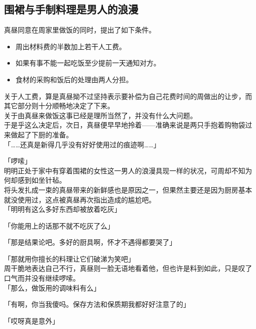 \subsection{围裙与手制料理是男人的浪漫}

真昼同意在周家里做饭的同时，提出了如下条件。\\

\begin{itemize}
    \item 周出材料费的半数加上若干人工费。
    \item 如果有事不能一起吃饭至少提前一天通知对方。
    \item 食材的采购和饭后的处理由两人分担。
\end{itemize}

关于人工费，算是真昼拗不过坚持表示要补偿为自己花费时间的周做出的让步，而其它部分则十分顺畅地决定了下来。\\

关于由真昼来做饭这事已经是理所当然了，并没有什么大问题。\\

于是乎这么决定后，次日，真昼便早早地拎着——准确来说是两只手抱着购物袋过来做起了下厨的准备。\\

「……还真是新得几乎没有好好使用过的痕迹啊……」

「啰嗦」\\

明明正处于家中有穿着围裙的女性这一男人的浪漫具现一样的状况，可周却不知为何却感到如坐针毡。\\

将头发扎成一束的真昼带来的新鲜感也是原因之一，但果然主要还是因为厨房基本就没使用过，这点被真昼再次指出造成的尴尬吧。\\

「明明有这么多好东西却被放着吃灰」

「你能用上的话那不就不吃灰了么」

「那是结果论吧。多好的厨具啊，怀才不遇得都要哭了」

「那就用你擅长的料理让它们破涕为笑吧」\\

周干脆地表达自己不行，真昼则一脸无语地看着他，但也许是料到如此，只是叹了口气而并没有继续啰嗦。\\

「那么，做饭用的调味料有么」

「有啊，你当我傻吗。保存方法和保质期我都好好注意了的」

「哎呀真是意外」

